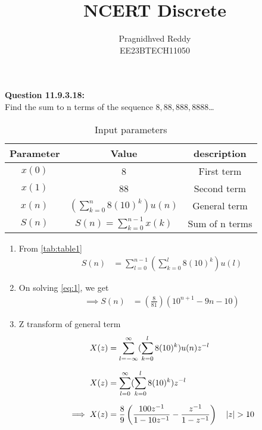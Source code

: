 \documentclass[journal,12pt,twocolumn]{IEEEtran}
\title{NCERT Discrete}
\author{Pragnidhved Reddy\\EE23BTECH11050}
\date{}
\begin{document}
\maketitle
\newpage
\bigskip
\textbf{Question 11.9.3.18:}\\
 Find the sum to n terms of the sequence $8,88,888,8888$\ldots\\
 \solution
\begin{table}[H]
\centering
\setlength{\extrarowheight}{8pt}
\begin{tabular}{|c|c|c|}\hline
\textbf{Parameter} & \textbf{Value} & \textbf{description}\\ \hline
$x(0)$ & 8 & First term \\ \hline
$x(1)$ & 88 & Second term \\ \hline 
$x(n)$ & $(\sum^{n}_{k=0}8(10)^k)u(n)$ & General term \\ \hline
$S(n)$ & $S(n)=\sum^{n-1}_{k=0}x(k)$ & Sum of n terms \\ \hline
\end{tabular}
\caption{Input parameters}
\label{tab:table1}
\end{table}
\begin{enumerate}
 \item From \eqref{tab:table1}
\begin{align}
\label{eq:1}
 S(n)&=\sum^{n-1}_{l=0}(\sum^{l}_{k=0}8(10)^k)u(l)
 \end{align}
 \item On solving \eqref{eq:1}, we get
 \begin{align}
 \implies S(n)&=\left(\frac{8}{81}\right)(10^{n+1}-9n-10)
 \end{align}
 \item Z transform of general term
 \begin{align}
 X(z)&=\sum_{l=-\infty}^{\infty}(\sum_{k=0}^{l}8(10)^k)u(n)z^{-l}\\[6pt]
 X(z)&=\sum_{l=0}^{\infty}(\sum_{k=0}^{l}8(10)^k)z^{-l}\\[6pt]
 \implies X(z)&=\frac{8}{9}\left(\frac{100z^{-1}}{1-10z^{-1}}-\frac{z^{-1}}{1-z^{-1}}\right) \quad \left\vert z\right\vert>10
 \end{align}
 \end{enumerate}
 
\end{document}

